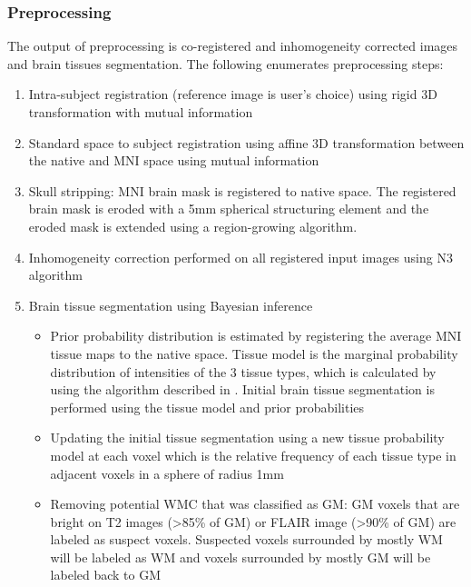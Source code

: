 \subsubsection{Preprocessing}
The output of preprocessing is co-registered and inhomogeneity corrected images and brain tissues segmentation. The following enumerates preprocessing steps:
\begin{enumerate}
\item Intra-subject registration (reference image is user’s choice) using rigid 3D transformation with mutual information
\item Standard space to subject registration using affine 3D transformation between the native and MNI space using mutual information
\item Skull stripping: MNI brain mask is registered to native space. The registered brain mask is eroded with a 5mm spherical structuring element and the eroded mask is extended using a region-growing algorithm.
\item Inhomogeneity correction performed on all registered input images using N3 algorithm \cite{N3}
\item Brain tissue segmentation using Bayesian inference
\begin{itemize}
    \item Prior probability distribution is estimated by registering the average MNI tissue maps to the native space. Tissue model is the marginal probability distribution of intensities of the 3 tissue types, which is calculated by using the algorithm described in \cite{EM_Empirical}. Initial brain tissue segmentation is performed using the tissue model and prior probabilities
    \item Updating the initial tissue segmentation using a new tissue probability model at each voxel which is the relative frequency of each tissue type in adjacent voxels in a sphere of radius 1mm
    \item Removing potential WMC that was classified as GM: GM voxels that are bright on T2 images (>85\% of GM) or FLAIR image (>90\% of GM) are labeled as suspect voxels. Suspected voxels surrounded by mostly WM will be labeled as WM and voxels surrounded by mostly GM will be labeled back to GM
\end{itemize}
\end{enumerate}
  
  
  
  
  
  
  
  